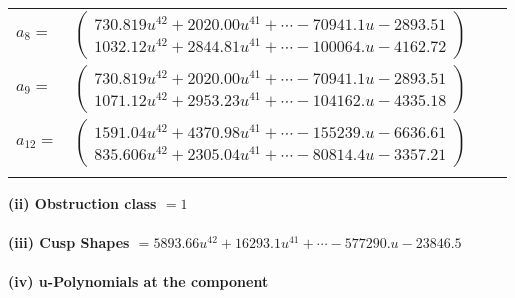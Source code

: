 \documentclass[1p]{elsarticle_modified}
\theoremstyle{definition}
\begin{document}
\begin{tabular}{m{7pt} m{180pt} m{7pt} m{180pt} }
\flushright $a_{8}=$&$\begin{pmatrix}730.819 u^{42}+2020.00 u^{41}+\cdots-70941.1 u-2893.51\\1032.12 u^{42}+2844.81 u^{41}+\cdots-100064. u-4162.72\end{pmatrix}$ \\
\flushright $a_{9}=$&$\begin{pmatrix}730.819 u^{42}+2020.00 u^{41}+\cdots-70941.1 u-2893.51\\1071.12 u^{42}+2953.23 u^{41}+\cdots-104162. u-4335.18\end{pmatrix}$ \\
\flushright $a_{12}=$&$\begin{pmatrix}1591.04 u^{42}+4370.98 u^{41}+\cdots-155239. u-6636.61\\835.606 u^{42}+2305.04 u^{41}+\cdots-80814.4 u-3357.21\end{pmatrix}$\\&\end{tabular}
\flushleft \textbf{(ii) Obstruction class $= 1$}\\~\\
\flushleft \textbf{(iii) Cusp Shapes $= 5893.66 u^{42}+16293.1 u^{41}+\cdots-577290. u-23846.5$}\\~\\
\newpage\renewcommand{\arraystretch}{1}
\flushleft \textbf{(iv) u-Polynomials at the component}\newline \\
\end{document}
